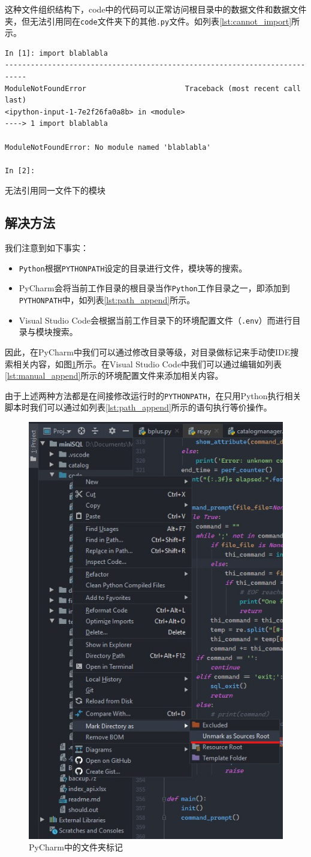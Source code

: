 \documentclass[UTF8]{ctexrep} %
\newenvironment{longlisting}{\captionsetup{type=listing}}{}
\begin{document}
这种文件组织结构下，code中的代码可以正常访问根目录中的数据文件和数据文件夹，但无法引用同在\texttt{code}文件夹下的其他\texttt{.py}文件。如列表\ref{lst:cannot_import}所示。
\begin{longlisting}
    \begin{verbatim}
In [1]: import blablabla
---------------------------------------------------------------------------
ModuleNotFoundError                       Traceback (most recent call last)
<ipython-input-1-7e2f26fa0a8b> in <module>
----> 1 import blablabla

ModuleNotFoundError: No module named 'blablabla'

In [2]:
    \end{verbatim}
    \caption{无法引用同一文件下的模块}
    \label{lst:cannot_import}
\end{longlisting}

\subsection{解决方法}
我们注意到如下事实：
\begin{itemize}
    \item \texttt{Python}根据\texttt{PYTHONPATH}设定的目录进行文件，模块等的搜索。
    \item PyCharm会将当前工作目录的根目录当作\texttt{Python}工作目录之一，即添加到\texttt{PYTHONPATH}中，如列表\ref{lst:path_append}所示。
    \item Visual Studio Code会根据当前工作目录下的环境配置文件（\texttt{.env}）而进行目录与模块搜索。
\end{itemize}

因此，在PyCharm中我们可以通过修改目录等级，对目录做标记来手动使IDE搜索相关内容，如图\ref{fig:folder_label}所示。在Visual Studio Code中我们可以通过编辑如列表\ref{lst:manual_append}所示的环境配置文件来添加相关内容。
\par
由于上述两种方法都是在间接修改运行时的\texttt{PYTHONPATH}，在只用Python执行相关脚本时我们可以通过如列表\ref{lst:path_append}所示的语句执行等价操作。

\begin{figure}[H]
    \centering
    \includegraphics[width=0.4\linewidth]{figure/path_append.jpg}
    \caption{PyCharm中的文件夹标记}
    \label{fig:folder_label}
\end{figure}
\end{document}

